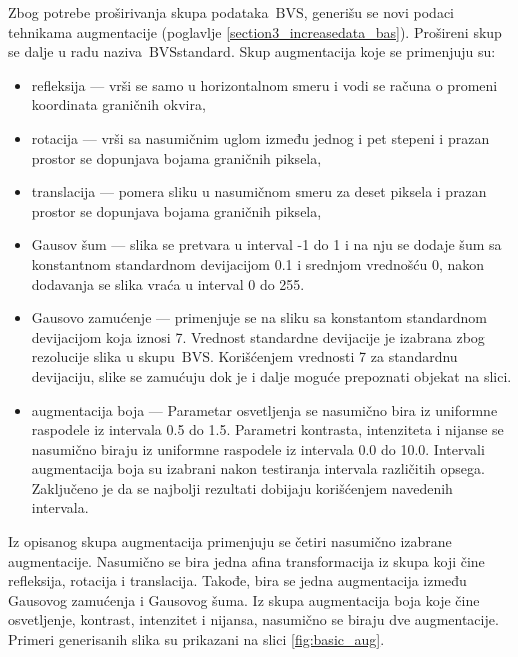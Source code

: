 \documentclass[12pt,oneside]{memoir}
\newcommand{\bvs}{\ensuremath{\,\textrm{BVS}}}
\begin{document}
Zbog potrebe proširivanja skupa podataka \bvs, generišu se novi podaci tehnikama augmentacije (poglavlje \ref{section3_increasedata_bas}). Prošireni skup se dalje u radu naziva \bvs{standard}.
Skup augmentacija koje se primenjuju su: 
\begin{itemize}
    \item refleksija --- vrši se samo u horizontalnom smeru i vodi se računa o promeni koordinata graničnih okvira, 
    \item rotacija --- vrši sa nasumičnim uglom između jednog i pet stepeni i prazan prostor se dopunjava bojama graničnih piksela,
    \item translacija ---  pomera sliku u nasumičnom smeru za deset piksela i prazan prostor se dopunjava bojama graničnih piksela,
    \item Gausov šum --- slika se pretvara u interval -1 do 1 i na nju se dodaje šum sa konstantnom standardnom devijacijom 0.1 i srednjom vrednošću 0, nakon dodavanja se slika vraća u interval 0 do 255.
    \item Gausovo zamućenje --- primenjuje se na sliku sa konstantom standardnom devijacijom koja iznosi 7. Vrednost standardne devijacije je izabrana zbog rezolucije slika u skupu \bvs. Korišćenjem vrednosti 7 za standardnu devijaciju, slike se zamućuju dok je i dalje moguće prepoznati objekat na slici.
    \item augmentacija boja --- Parametar osvetljenja se nasumično bira iz uniformne raspodele iz intervala 0.5 do 1.5. Parametri kontrasta, intenziteta i nijanse se nasumično biraju iz uniformne raspodele iz intervala 0.0 do 10.0. Intervali augmentacija boja su izabrani nakon testiranja intervala različitih opsega. Zaključeno je da se najbolji rezultati dobijaju korišćenjem navedenih intervala.
\end{itemize}

\noindent Iz opisanog skupa augmentacija primenjuju se četiri nasumično izabrane augmentacije. Nasumično se bira jedna afina transformacija iz skupa koji čine refleksija, rotacija i translacija. Takođe, bira se jedna augmentacija između Gausovog zamućenja i Gausovog šuma. Iz skupa augmentacija boja koje čine osvetljenje, kontrast, intenzitet i nijansa, nasumično se biraju dve augmentacije. Primeri generisanih slika su prikazani na slici \ref{fig:basic_aug}.
\end{document}
